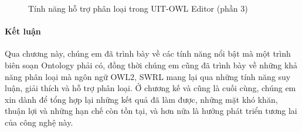 \begin{figure}[h!]
	\centering
	\caption{Tính năng hỗ trợ phân loại trong UIT-OWL Editor (phần 3)\label{overflow}}
\end{figure}
\paragraph{Kết luận} Qua chương này, chúng em đã trình bày về các tính năng nổi bật mà một trình biên soạn Ontology phải có, đồng thời chúng em cũng đã trình bày về những khả năng phân loại mà ngôn ngữ OWL2, SWRL mang lại qua những tính năng suy luận, giải thích và hỗ trợ phân loại. Ở chương kế và cũng là cuối cùng, chúng em xin dành để tổng hợp lại những kết quả đã làm được, những mặt khó khăn, thuận lợi và những hạn chế còn tồn tại, và hơn nữa là hướng phát triển tương lai của công nghệ này.




